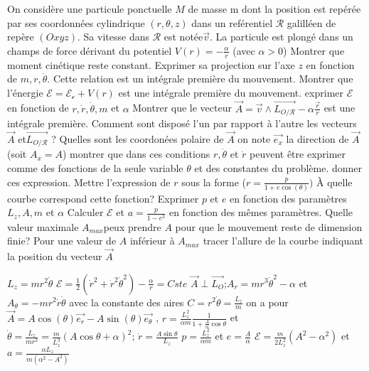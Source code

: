 \begin{Exercise}[title=(*) Vecteur de Runge-Lentz]
  On considère une particule ponctuelle $M$ de masse m dont la position est
  repérée par ses coordonnées cylindrique $(r,\theta,z)$ dans un reférentiel
  $\mathcal{R}$  galilléen de repère $(Oxyz)$. Sa vitesse dans $\mathcal{R}$
  est notée$\vec{v}$. La particule est plongé dans un champs de force dérivant
  du potentiel $V(r)=-\frac{\alpha}{r}$ (avec $\alpha>0$)
  \Question Montrer que moment cinétique reste constant. Exprimer sa projection
  sur l'axe $z$ en fonction de $m,r,\dot{\theta}$. Cette relation est un intégrale
  première du mouvement.
  \Question Montrer que l'énergie $\mathcal{E}=\mathcal{E_c}+V(r)$ est une
  intégrale première du mouvement. exprimer $\mathcal{E}$ en fonction de
  $r,\dot{r},\dot{\theta},m$ et $\alpha$
  \Question
  \subQuestion Montrer que le vecteur $\vec{A}=\vec{v}\wedge
  \vec{L_{O/\mathcal{R}}}-\alpha \frac{\vec{r}}{r}$ est une intégrale première.
  Comment sont disposé l'un par rapport à l'autre les vecteurs $\vec{A}$
  et$\vec{L_{O/\mathcal{R}}}$ ? Quelles sont les coordonées polaire de $\vec{A}$
  on note $\vec{e_x}$ la direction de $\vec{A}$ (soit $A_x=A$) montrer que dans
  ces conditions $r,\dot{\theta}$ et $\dot{r}$  peuvent être exprimer comme des
  fonctions de la seule variable $\theta$ et des constantes du problème. donner ces
  expression.
  \subQuestion Mettre l'expression de $r$ sous la forme
  ($r=\frac{p}{1+e\cos(\theta)})$  À quelle courbe correspond cette fonction?
  Exprimer $p$ et $e$ en fonction des paramètres $L_z,A,m$ et $\alpha$
  \subQuestion Calculer $\mathcal{E}$ et $a=\frac{p}{1-e^2}$ en fonction des
  mêmes paramètres. Quelle valeur maximale $A_{max}$peux prendre $A$ pour que le
  mouvement reste de dimension finie? Pour une valeur de $A$ inférieur à
  $A_{max}$ tracer l'allure de la courbe indiquant la position du vecteur
  $\vec{A}$

\end{Exercise}
\begin{Answer}
  \Question $L_z=mr^2\dot{\theta}$
  \Question
  $\mathcal{E}=\frac{1}{2}(\dot{r}^2+\dot{r}^2\dot{\theta}^2)-\frac{\alpha}{r}=Cste$
  \Question
  \subQuestion $\vec{A}\perp \vec{L_O}$;$A_r=mr^3\dot{\theta}^2-\alpha$ et
  $A_\theta=-mr^2\dot{r}\dot{\theta}$ avec la constante des aires
  $C=r^2\dot{\theta}=\frac{L_z}{m}$ on a pour
  $\vec{A}=A\cos(\theta)\vec{e_r}-A\sin(\theta)\vec{e_\theta}$ , $r=\frac{L_z^2}{\alpha
    m}\frac{1}{1+\frac{A}{\alpha}\cos\theta}$ et
  $\dot{\theta}=\frac{L_z}{mr^2}=\frac{m}{L_z^3}(A\cos\theta+\alpha)^2$;
  $\dot{r}=\frac{A\sin\theta}{L_z}$
  \subQuestion $p=\frac{L_z^2}{\alpha m}$ et $e=\frac{A}{\alpha}$
  \subQuestion $\mathcal{E}=\frac{m}{2L_z^2}(A^2-\alpha^2)$ et $a=\frac{\alpha
    L_z}{m(\alpha^2-A^2)}$
\end{Answer}

